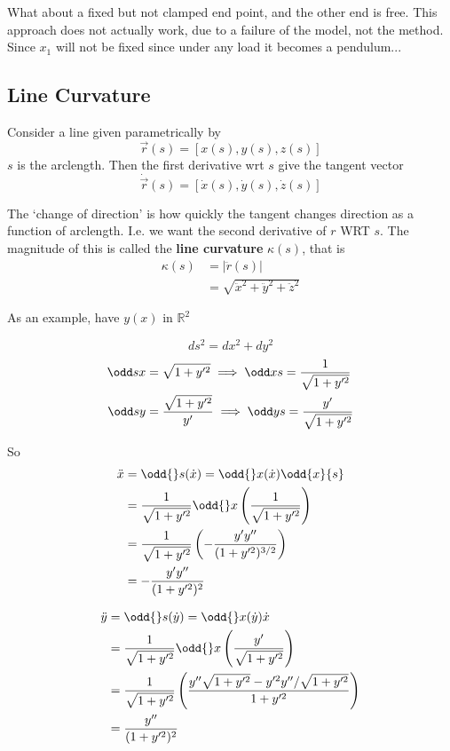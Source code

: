 \documentclass{E:/Documents/Latex/myassignment}
\begin{document}
What about a fixed but not clamped end point, and the other end is free. This approach does not actually work, due to a failure of the model, not the method. Since $x_1$ will not be fixed since under any load it becomes a pendulum...



\subsection{Line Curvature}
Consider a line given parametrically by
\[\vec r(s) = [x(s),y(s),z(s)]\]
$s$ is the arclength. Then the first derivative wrt $s$ give the tangent vector
\[\dot{\vec{r}}(s) = [\dot x(s),\dot y(s),\dot z(s)]\]

The `change of direction' is how quickly the tangent changes direction as a function of arclength. I.e. we want the second derivative of $r$ WRT $s$. The magnitude of this is called the \textbf{line curvature} $\kappa(s)$, that is
\begin{align*}
	\kappa(s) &= |\ddot{r}(s)|\\
	&=\sqrt{\ddot x^2 + \ddot y^2 + \ddot z^2}
\end{align*}


As an example, have $y(x)$ in $\mathbb{R}^2$

\[ds^2 = dx^2 + dy^2\]
\begin{align*}
	\odd sx &= \sqrt{1+y'^2} \implies \odd xs = \frac{1}{\sqrt{1+y'^2}}\\
	\odd sy &= \frac{\sqrt{1+y'^2}}{y'} \implies \odd ys = \frac{y'}{\sqrt{1+y'^2}}
\end{align*}

So
\begin{align*}
	\ddot x &= \odd{}s(\dot x) = \odd{}x(\dot x) \odd{x}{s}\\
	&= \frac{1}{\sqrt{1+y'^2}} \odd{}x \left(\frac{1}{\sqrt{1+y'^2}}\right)\\
	&= \frac{1}{\sqrt{1+y'^2}} \left(-\frac{y'y''}{(1+y'^2)^{3/2}}\right)\\
	&= -\frac{y'y''}{(1+y'^2)^{2}}
\end{align*}

\begin{align*}
	\ddot y &= \odd{}s(\dot y) = \odd{}x (\dot y) \dot x\\
	&= \frac{1}{\sqrt{1+y'^2}} \odd{}x \left(\frac{y'}{\sqrt{1+y'^2}}\right)\\
	&= \frac{1}{\sqrt{1+y'^2}}  \left(\frac{y''\sqrt{1+y'^2} - y'^2 y''/\sqrt{1+y'^2} }{1+y'^2}\right)\\
	&= \frac{y''}{(1+y'^2)^2}
\end{align*}
\end{document}
